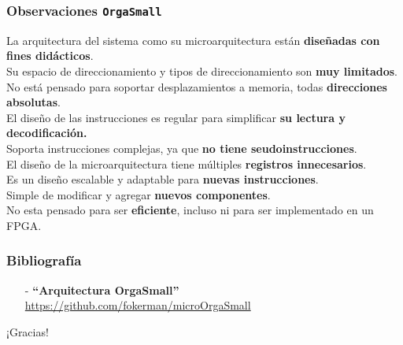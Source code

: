 \documentclass[aspectratio=169]{beamer}
\begin{document}
\begin{frame}[fragile]
    \frametitle{Observaciones \texttt{OrgaSmall}}
    La arquitectura del sistema como su microarquitectura están \textbf{diseñadas con fines didácticos}.\\
    \vspace{0.2cm}
    Su espacio de direccionamiento y tipos de direccionamiento son \textbf{muy limitados}.\\
    \vspace{0.2cm}
    No está pensado para soportar desplazamientos a memoria, todas \textbf{direcciones absolutas}.\\
    \vspace{0.2cm}
    \pause
    El diseño de las instrucciones es regular para simplificar \textbf{su lectura y decodificación.}\\
    \vspace{0.2cm}
    Soporta instrucciones complejas, ya que \textbf{no tiene seudoinstrucciones}.\\
    \vspace{0.2cm}
    El diseño de la microarquitectura tiene múltiples \textbf{registros innecesarios}.\\
    \vspace{0.2cm}
    \pause
    Es un diseño escalable y adaptable para \textbf{nuevas instrucciones}.\\
    \vspace{0.2cm}
    Simple de modificar y agregar \textbf{nuevos componentes}.\\
    \vspace{0.4cm}
    \pause
    \textcolor{rojo}{No esta pensado para ser \textbf{eficiente}, incluso ni para ser implementado en un FPGA.}\\
\end{frame}

\begin{frame}[fragile]
    \frametitle{Bibliografía}
    \begin{itemize}
    \setlength\itemsep{0.5cm}
    \item[-] \textbf{``Arquitectura OrgaSmall''}\\
    \url{https://github.com/fokerman/microOrgaSmall}\\
    \end{itemize}
\end{frame}

\begin{frame}[plain]
    \begin{center}
    \vspace{2cm}
    \huge ¡Gracias!\\
    \vspace{2cm}
    \end{center}
\end{frame}
\end{document}
